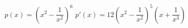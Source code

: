 {$p(x) = \left(x^2 - \dfrac{1}{x^2}\right)^6$
}
{$p'(x) = 12\left(x^2 - \dfrac{1}{x^2}\right)^5 \left(x + \dfrac{1}{x^3}\right)$
}
